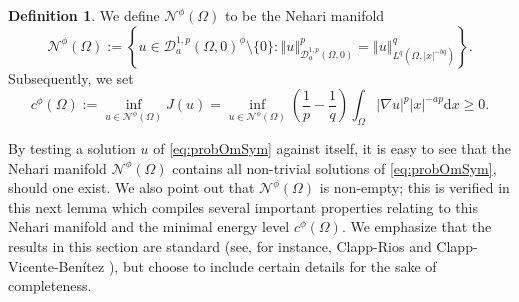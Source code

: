 \documentclass[10pt, reqno]{amsart}
\newcommand{\Om}{\Omega}
\newcommand{\abs}[1]{\left\vert #1 \right\vert}
\newcommand{\norm}[1]{\left\Vert #1 \right\Vert}
\newcommand{\D}{\mathcal{D}}
\newcommand{\N}{\mathcal{N}}
\renewcommand{\d}{\mathrm{d}}
\numberwithin{equation}{section}
\theoremstyle{definition}
\newtheorem{defn}{Definition}[section]
\theoremstyle{remark}
\theoremstyle{plain}
\begin{document}
	\begin{defn}
		We define $\N^\phi(\Om)$ to be the Nehari manifold
		\[	
		\N^\phi(\Om) := \left\{ u \in \D_a^{1,p}(\Om,0)^\phi \setminus \{0\} : \norm{u}^p_{\D_a^{1,p}(\Om,0)} = \norm{u}_{L^q(\Om, \abs{x}^{-bq})}^q \right\}.
		\]
		Subsequently, we set
		\begin{equation}
			c^\phi(\Om) := \inf_{u \in \N^{\phi}(\Om)} J(u) =  \inf_{u \in \N^{\phi}(\Om)} \left(\frac{1}{p} - \frac{1}{q}\right) \int_{\Om} \abs{\nabla u}^p\abs{x}^{-ap}\d{x} \ge 0.
		\end{equation}
	\end{defn}
	By testing a solution $u$ of \eqref{eq:probOmSym} against itself, it is easy to see that the Nehari manifold $\N^\phi(\Om)$ contains all non-trivial solutions of \eqref{eq:probOmSym}, should one exist. We also point out that $\N^\phi(\Om)$ is non-empty; this is verified in this next lemma which compiles several important properties relating to this Nehari manifold and the minimal energy level $c^\phi(\Om)$. We emphasize that the results in this section are standard (see, for instance, Clapp-Rios \cite{clappRios} and Clapp-Vicente-Ben\'itez \cite{clapp2026entire}), but choose to include certain details for the sake of completeness.
	
\end{document}
